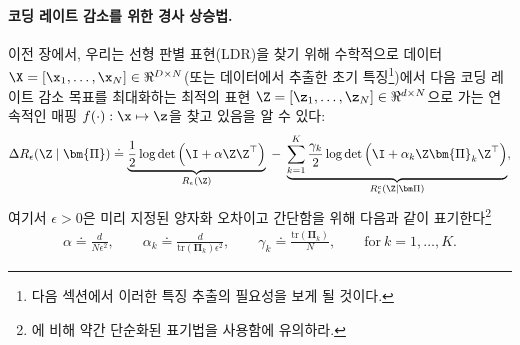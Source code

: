 \documentclass[../../book-main_ko.tex]{subfiles}
\begin{document}
\paragraph{코딩 레이트 감소를 위한 경사 상승법.} 이전 장에서, 우리는 선형 판별 표현(LDR)을 찾기 위해 수학적으로 데이터 $\X = [\x_1, \ldots, \x_N] \in \Re^{D \times N}$(또는 데이터에서 추출한 초기 특징\footnote{다음 섹션에서 이러한 특징 추출의 필요성을 보게 될 것이다.})에서 다음 코딩 레이트 감소 목표를 최대화하는 최적의 표현 $\Z = [\z_1, \ldots, \z_N] \in \Re^{d \times N}$으로 가는 연속적인 매핑 $f(\cdot): \x \mapsto \z$을 찾고 있음을 알 수 있다:
\begin{equation}\label{eq:mcr-formulation}
\begin{split}
\Delta R_{\epsilon}(\Z \mid \bm{\Pi}) \doteq \underbrace{\frac{1}{2}\log\det \Big(\I + {\alpha} \Z \Z^{\top} \Big)}_{R_{\epsilon}(\Z)} \;-\; \underbrace{\sum_{k=1}^{K}\frac{\gamma_{k}}{2} \log\det\Big(\I + {\alpha_{k}} \Z \bm{\Pi}_{k} \Z^{\top} \Big)}_{R_{\epsilon}^c(\Z \mid \bm \Pi)},
\end{split}
\end{equation}
여기서 $\epsilon > 0$은 미리 지정된 양자화 오차이고 간단함을 위해 다음과 같이 표기한다\footnote{에 비해 약간 단순화된 표기법을 사용함에 유의하라.}
\begin{align*}
    \alpha \doteq \frac{d}{N\epsilon^2}, \qquad \alpha_{k} \doteq \frac{d}{\mathrm{tr}(\bm{\Pi}_{k})\epsilon^2}, \qquad \gamma_{k} \doteq \frac{\mathrm{tr}(\bm{\Pi}_{k})}{N}, \qquad \text{for}\ k = 1,\ldots, K.
\end{align*}
\end{document}
